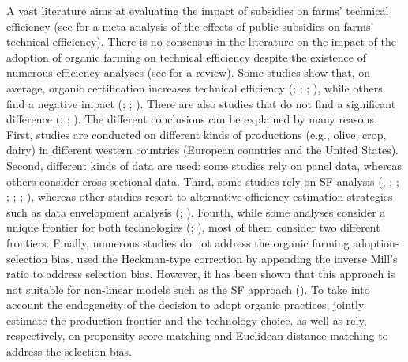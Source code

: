 \begin{Article}
\begin{refsection}[Lassalas]
A vast literature aims at evaluating the impact of subsidies on farms'
technical efficiency (see \textcite{minviel_latruffe_2016} for a
meta-analysis of the effects of public subsidies on farms' technical
efficiency). There is no consensus in the literature on the impact of
the adoption of organic farming on technical efficiency despite the
existence of numerous efficiency analyses (see \textcite{lakner_breustedt_2017} for a review). Some studies show that, on average, organic
certification increases technical efficiency (\textcites{tzouvelekas_pantzios_fotopoulos_2001, tzouvelekas_pantzios_fotopoulos_2002}; \textcite{oude_lansink_2002}; \textcite{tiedemann_latacz-lohmann_2013}; \textcite{grovermann_et_al_2021}), while others find a negative impact (\textcite{sipilainen_oude_lansink_2005}; \textcite{kumbhakar_tsionas_sipilainen_2009}; \textcite{serra_goodwin_2009}). There are also studies that do not find a
significant difference (\textcite{mayen_balagtas_alexander_2010}; \textcite{sauer_2010}; \textcite{grovermann_et_al_2021}). The different
conclusions can be explained by many reasons. First, studies are
conducted on different kinds of productions (e.g., olive, crop, dairy)
in different western countries (European countries and the United
States). Second, different kinds of data are used: some studies rely on
panel data, whereas others consider cross-sectional data. Third, some
studies rely on SF analysis (\textcite{tzouvelekas_pantzios_fotopoulos_2001};
\textcite{tzouvelekas_pantzios_fotopoulos_2002}; \textcite{sipilainen_oude_lansink_2005}; \textcite{kumbhakar_tsionas_sipilainen_2009}; \textcite{mayen_balagtas_alexander_2010}; \textcite{tiedemann_latacz-lohmann_2013}; \textcite{grovermann_et_al_2021}), whereas other studies resort to alternative efficiency
estimation strategies such as data envelopment analysis (\textcite{oude_lansink_2002}; \textcite{sipilainen_huhtala_2013}). Fourth, while some
analyses consider a unique frontier for both technologies (\textcite{sipilainen_huhtala_2013}; \textcite{aldanondo2014}), most
of them consider two different frontiers. Finally, numerous studies do
not address the organic farming adoption-selection bias. \textcite{sipilainen_oude_lansink_2005} used the Heckman-type correction by appending
the inverse Mill's ratio to address selection bias. However, it has been
shown that this approach is not suitable for non-linear models such as
the SF approach (\textcite{greene_2010}). To take into account the
endogeneity of the decision to adopt organic practices, \textcite{kumbhakar_tsionas_sipilainen_2009} jointly estimate the production frontier and
the technology choice. \textcite{mayen_balagtas_alexander_2010} as well as \textcite{tiedemann_latacz-lohmann_2013} rely, respectively, on propensity score
matching and Euclidean-distance matching to address the selection bias.


\end{refsection}
\end{Article}
